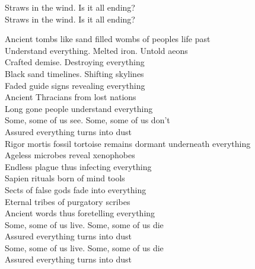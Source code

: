 Straws in the wind. Is it all ending? \\
Straws in the wind. Is it all ending? \\




Ancient tombs like sand filled wombs of peoples life past \\
Understand everything. Melted iron. Untold aeons \\
Crafted demise. Destroying everything \\

Black sand timelines. Shifting skylines \\
Faded guide signs revealing everything \\
Ancient Thracians from lost nations \\
Long gone people understand everything \\

Some, some of us see. Some, some of us don't \\
Assured everything turns into dust \\

Rigor mortis fossil tortoise remains dormant underneath everything \\
Ageless microbes reveal xenophobes \\
Endless plague thus infecting everything \\

Sapien rituals born of mind tools \\
Sects of false gods fade into everything \\
Eternal tribes of purgatory scribes \\
Ancient words thus foretelling everything \\

Some, some of us live. Some, some of us die \\
Assured everything turns into dust \\
Some, some of us live. Some, some of us die \\
Assured everything turns into dust \\




